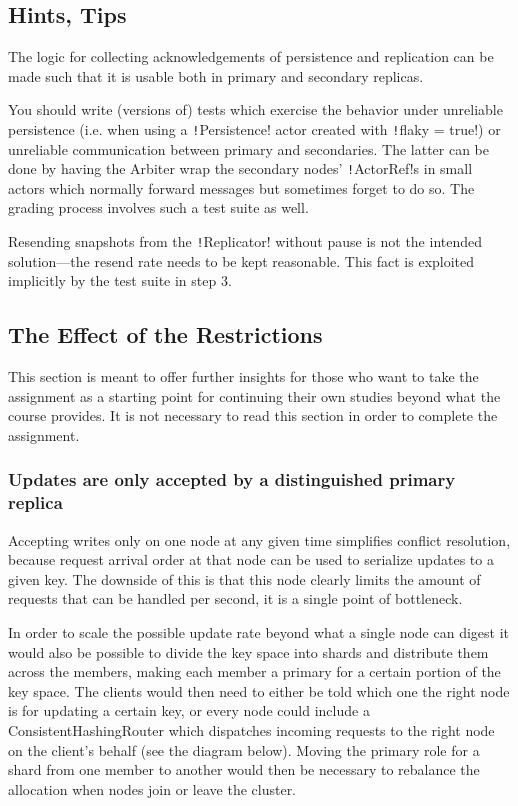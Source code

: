 \documentclass{article}
\begin{document}
\subsection{Hints, Tips}

The logic for collecting acknowledgements of persistence and replication can be made such that it is usable both in primary and secondary replicas.

You should write (versions of) tests which exercise the behavior under unreliable persistence (i.e. when using a \texttt!Persistence! actor created with \texttt!flaky = true!) or unreliable communication between primary and secondaries. The latter can be done by having the Arbiter wrap the secondary nodes’ \texttt!ActorRef!s in small actors which normally  forward messages but sometimes forget to do so. The grading process  involves such a test suite as well.

Resending snapshots from the \texttt!Replicator! without  pause is not the intended solution—the resend rate needs to be kept  reasonable. This fact is exploited implicitly by the test suite in step  3.

\subsection{The Effect of the Restrictions}\label{ss:theeffectoftherestrictions}
This section is meant to offer further insights for those who want to  take the assignment as a starting point for continuing their own  studies beyond what the course provides. It is not necessary to read  this section in order to complete the assignment.

\subsubsection{Updates are only accepted by a distinguished primary replica}

Accepting writes only on one node at any given time simplifies  conflict resolution, because request arrival order at that node can be  used to serialize updates to a given key. The downside of this is that  this node clearly limits the amount of requests that can be handled per second, it is a single point of bottleneck.

In order to scale the possible update rate beyond what a single node  can digest it would also be possible to divide the key space into shards  and distribute them across the members, making each member a primary  for a certain portion of the key space. The clients would then need to  either be told which one the right node is for updating a certain key,  or every node could include a ConsistentHashingRouter which dispatches  incoming requests to the right node on the client’s behalf (see the  diagram below). Moving the primary role for a shard from one member to  another would then be necessary to rebalance the allocation when nodes  join or leave the cluster.
\end{document}
